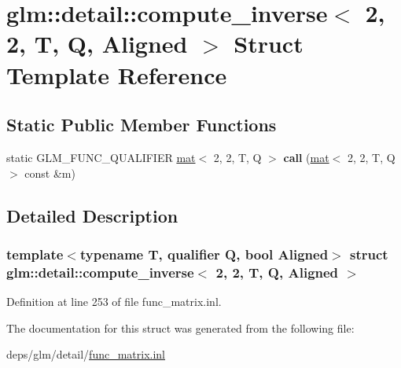 \hypertarget{structglm_1_1detail_1_1compute__inverse_3_012_00_012_00_01T_00_01Q_00_01Aligned_01_4}{}\section{glm\+:\+:detail\+:\+:compute\+\_\+inverse$<$ 2, 2, T, Q, Aligned $>$ Struct Template Reference}
\label{structglm_1_1detail_1_1compute__inverse_3_012_00_012_00_01T_00_01Q_00_01Aligned_01_4}
\subsection*{Static Public Member Functions}
\begin{DoxyCompactItemize}
\item 
\mbox{\label{structglm_1_1detail_1_1compute__inverse_3_012_00_012_00_01T_00_01Q_00_01Aligned_01_4_abc2ed8842638094e0aa6df0285997eb9}} 
static G\+L\+M\+\_\+\+F\+U\+N\+C\+\_\+\+Q\+U\+A\+L\+I\+F\+I\+ER \hyperlink{structglm_1_1mat}{mat}$<$ 2, 2, T, Q $>$ {\bfseries call} (\hyperlink{structglm_1_1mat}{mat}$<$ 2, 2, T, Q $>$ const \&m)
\end{DoxyCompactItemize}


\subsection{Detailed Description}
\subsubsection*{template$<$typename T, qualifier Q, bool Aligned$>$\newline
struct glm\+::detail\+::compute\+\_\+inverse$<$ 2, 2, T, Q, Aligned $>$}



Definition at line 253 of file func\+\_\+matrix.\+inl.



The documentation for this struct was generated from the following file\+:\begin{DoxyCompactItemize}
\item 
deps/glm/detail/\hyperlink{func__matrix_8inl}{func\+\_\+matrix.\+inl}\end{DoxyCompactItemize}
